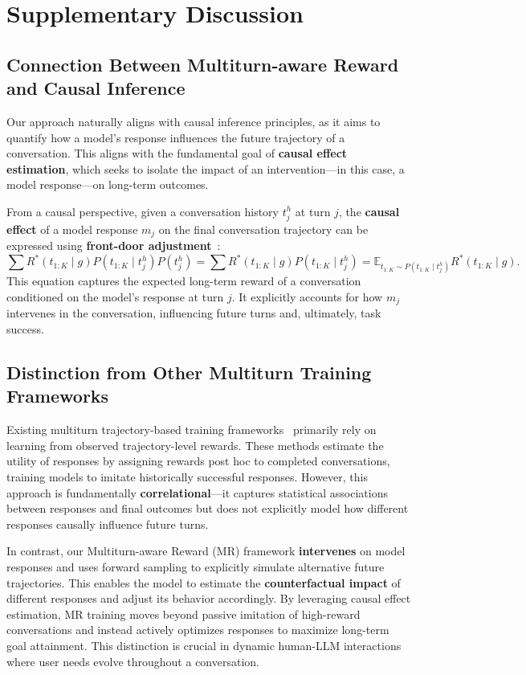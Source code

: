
\section{Supplementary Discussion}
\label{app:discussion}

\subsection{Connection Between Multiturn-aware Reward and Causal Inference}

Our approach naturally aligns with causal inference principles, as it aims to quantify how a model's response influences the future trajectory of a conversation. This aligns with the fundamental goal of \textbf{causal effect estimation}, which seeks to isolate the impact of an intervention---in this case, a model response---on long-term outcomes.

From a causal perspective, given a conversation history \( t^h_j \) at turn \( j \), the \textbf{causal effect} of a model response \( m_j \) on the final conversation trajectory can be expressed using \textbf{front-door adjustment}~\citep{Pearl09a, pearl2016causal}:
\begin{equation}
    \sum R^*(t_{1:K} \mid g) P(t_{1:K} \mid t^h_j)P(t^h_j) = \sum R^*(t_{1:K} \mid g) P(t_{1:K} \mid t^h_j) = \mathbb{E}_{t_{1:K} \sim P(t_{1:K} \mid t^h_j)} R^*(t_{1:K} \mid g).
\end{equation}
This equation captures the expected long-term reward of a conversation conditioned on the model’s response at turn \( j \). It explicitly accounts for how \( m_j \) intervenes in the conversation, influencing future turns and, ultimately, task success.


\subsection{Distinction from Other Multiturn Training Frameworks}

Existing multiturn trajectory-based training frameworks~\citep{multiturn_rlhf, archer, refuel} primarily rely on learning from observed trajectory-level rewards. These methods estimate the utility of responses by assigning rewards post hoc to completed conversations, training models to imitate historically successful responses. However, this approach is fundamentally \textbf{correlational}---it captures statistical associations between responses and final outcomes but does not explicitly model how different responses causally influence future turns.

In contrast, our Multiturn-aware Reward (MR) framework \textbf{intervenes} on model responses and uses forward sampling to explicitly simulate alternative future trajectories. This enables the model to estimate the \textbf{counterfactual impact} of different responses and adjust its behavior accordingly. By leveraging causal effect estimation, MR training moves beyond passive imitation of high-reward conversations and instead actively optimizes responses to maximize long-term goal attainment.
This distinction is crucial in dynamic human-LLM interactions where user needs evolve throughout a conversation. 




